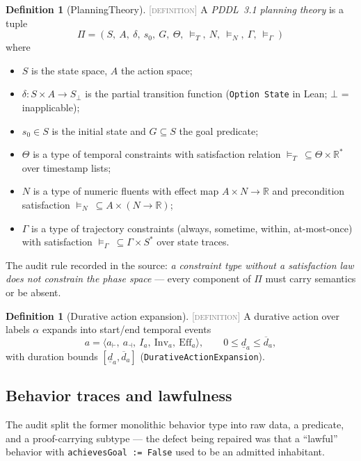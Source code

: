 \documentclass[11pt]{article}
\newcommand{\DEFINITION}{\textcolor{gray}{\textsc{[definition]}}}
\newcommand{\PT}{\Pi}                          %
\newcommand{\R}{\mathbb{R}}
\theoremstyle{plain}
\theoremstyle{definition}
\newtheorem{definition}[theorem]{Definition}
\begin{document}
\begin{definition}[PlanningTheory]\DEFINITION\;
A \emph{PDDL~3.1 planning theory} is a tuple
\[
  \PT = (S,\ A,\ \delta,\ s_0,\ G,\ \Theta,\ \models_T,\ N,\ \models_N,\ \Gamma,\ \models_\Gamma)
\]
where
\begin{itemize}[nosep]
  \item $S$ is the state space, $A$ the action space;
  \item $\delta : S \times A \to S_\bot$ is the partial transition function
        (\texttt{Option State} in Lean; $\bot$ = inapplicable);
  \item $s_0 \in S$ is the initial state and $G \subseteq S$ the goal predicate;
  \item $\Theta$ is a type of temporal constraints with satisfaction relation
        $\models_T\ \subseteq \Theta \times \R^{*}$ over timestamp lists;
  \item $N$ is a type of numeric fluents with effect map
        $A \times N \to \R$ and precondition satisfaction
        $\models_N\ \subseteq A \times (N \to \R)$;
  \item $\Gamma$ is a type of trajectory constraints (always, sometime,
        within, at-most-once) with satisfaction
        $\models_\Gamma\ \subseteq \Gamma \times S^{*}$ over state traces.
\end{itemize}
The audit rule recorded in the source: \emph{a constraint type without a
satisfaction law does not constrain the phase space} --- every component of
$\PT$ must carry semantics or be absent.
\end{definition}

\begin{definition}[Durative action expansion]\DEFINITION\;
A durative action over labels $\alpha$ expands into start/end temporal events
\[
  a = \langle a_{\vdash},\ a_{\dashv},\ I_a,\ \mathrm{Inv}_a,\ \mathrm{Eff}_a \rangle,
  \qquad
  0 \le \underline{d}_a \le \overline{d}_a,
\]
with duration bounds $[\underline{d}_a, \overline{d}_a]$
(\texttt{DurativeActionExpansion}).
\end{definition}

\subsection{Behavior traces and lawfulness}

The audit split the former monolithic behavior type into raw data, a
predicate, and a proof-carrying subtype --- the defect being repaired was
that a ``lawful'' behavior with \texttt{achievesGoal := False} used to be an
admitted inhabitant.
\end{document}
